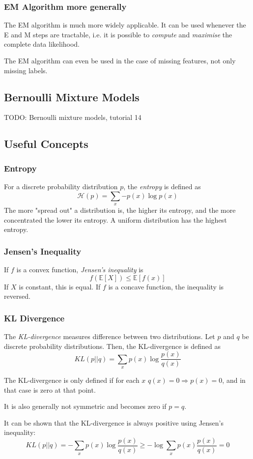 \subsubsection{EM Algorithm more generally}
The EM algorithm is much more widely applicable.
It can be used whenever the E and M steps are
tractable,
i.e. it is possible to
\emph{compute} and \emph{maximise}
the complete data likelihood.

The EM algorithm can even be used in
the case of missing features,
not only missing labels.


\subsection{Bernoulli Mixture Models}
TODO: Bernoulli mixture models, tutorial 14


\subsection{Useful Concepts}
\subsubsection{Entropy}
For a discrete probability distribution $p$,
the \emph{entropy} is defined as
\begin{equation*}
    \mathcal{H}(p) = \sum_x{-p(x) \log{p(x)}}
\end{equation*}
The more "spread out" a distribution is,
the higher its entropy,
and the more concentrated the lower its entropy.
A uniform distribution has the highest entropy.

\subsubsection{Jensen’s Inequality}
If $f$ is a convex function, \emph{Jensen's inequality} is
\begin{equation*}
    f(\mathbb{E}[X]) \leq \mathbb{E}[f(x)]
\end{equation*}
If $X$ is constant, this is equal.
If $f$ is a concave function,
the inequality is reversed.

\subsubsection{KL Divergence}
The \emph{KL-divergence} measures difference between
two distributions.
Let $p$ and $q$ be discrete probability distributions.
Then, the KL-divergence is defined as
\begin{equation*}
    KL(p || q) = \sum_x{p(x) \log{\frac{p(x)}{q(x)}}}
\end{equation*}

The KL-divergence is only defined if
for each $x$ $q(x) = 0 \Rightarrow p(x) = 0$,
and in that case is zero at that point.

It is also generally not symmetric
and becomes zero if $p = q$.

It can be shown that the KL-divergence is
always positive using Jensen's inequality:
\begin{equation*}
    KL(p || q) = -\sum_x{p(x) \log{\frac{p(x)}{q(x)}}} \geq - \log{
        \sum_x{p(x) \frac{p(x)}{q(x)}}
    } = 0
\end{equation*}